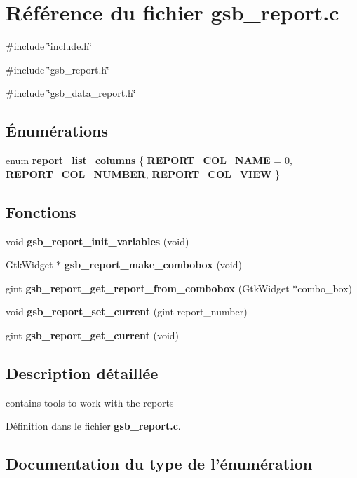 \section{Référence du fichier gsb\_\-report.c}
\label{gsb__report_8c}
{\ttfamily \#include \char`\"{}include.h\char`\"{}}\par
{\ttfamily \#include \char`\"{}gsb\_\-report.h\char`\"{}}\par
{\ttfamily \#include \char`\"{}gsb\_\-data\_\-report.h\char`\"{}}\par
\subsection*{Énumérations}
\begin{DoxyCompactItemize}
\item 
enum {\bf report\_\-list\_\-columns} \{ {\bf REPORT\_\-COL\_\-NAME} =  0, 
{\bf REPORT\_\-COL\_\-NUMBER}, 
{\bf REPORT\_\-COL\_\-VIEW}
 \}
\end{DoxyCompactItemize}
\subsection*{Fonctions}
\begin{DoxyCompactItemize}
\item 
void {\bf gsb\_\-report\_\-init\_\-variables} (void)
\item 
GtkWidget $\ast$ {\bf gsb\_\-report\_\-make\_\-combobox} (void)
\item 
gint {\bf gsb\_\-report\_\-get\_\-report\_\-from\_\-combobox} (GtkWidget $\ast$combo\_\-box)
\item 
void {\bf gsb\_\-report\_\-set\_\-current} (gint report\_\-number)
\item 
gint {\bf gsb\_\-report\_\-get\_\-current} (void)
\end{DoxyCompactItemize}


\subsection{Description détaillée}
contains tools to work with the reports 

Définition dans le fichier {\bf gsb\_\-report.c}.



\subsection{Documentation du type de l'énumération}
